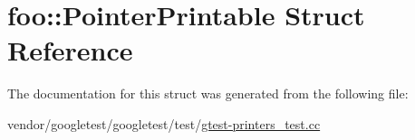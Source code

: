 \hypertarget{structfoo_1_1PointerPrintable}{}\section{foo\+:\+:Pointer\+Printable Struct Reference}
\label{structfoo_1_1PointerPrintable}


The documentation for this struct was generated from the following file\+:\begin{DoxyCompactItemize}
\item 
vendor/googletest/googletest/test/\hyperlink{gtest-printers__test_8cc}{gtest-\/printers\+\_\+test.\+cc}\end{DoxyCompactItemize}
